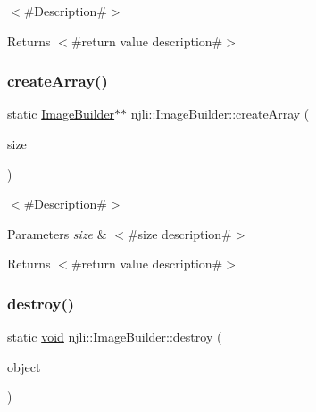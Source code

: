 $<$\#\+Description\#$>$

\begin{DoxyReturn}{Returns}
$<$\#return value description\#$>$ 
\end{DoxyReturn}
\mbox{\label{classnjli_1_1_image_builder_adfaa3f987876b3411e5ac6b2060d51c0}} 
\subsubsection{\texorpdfstring{create\+Array()}{createArray()}}
{\footnotesize\ttfamily static \mbox{\hyperlink{classnjli_1_1_image_builder}{Image\+Builder}}$\ast$$\ast$ njli\+::\+Image\+Builder\+::create\+Array (\begin{DoxyParamCaption}\item[{const \mbox{\hyperlink{_util_8h_a10e94b422ef0c20dcdec20d31a1f5049}{u32}}}]{size }\end{DoxyParamCaption})\hspace{0.3cm}{\ttfamily [static]}}

$<$\#\+Description\#$>$


\begin{DoxyParams}{Parameters}
{\em size} & $<$\#size description\#$>$\\
\hline
\end{DoxyParams}
\begin{DoxyReturn}{Returns}
$<$\#return value description\#$>$ 
\end{DoxyReturn}
\mbox{\label{classnjli_1_1_image_builder_a795fe08161c3424b63bee264dfd3726b}} 
\subsubsection{\texorpdfstring{destroy()}{destroy()}}
{\footnotesize\ttfamily static \mbox{\hyperlink{_thread_8h_af1e856da2e658414cb2456cb6f7ebc66}{void}} njli\+::\+Image\+Builder\+::destroy (\begin{DoxyParamCaption}\item[{\mbox{\hyperlink{classnjli_1_1_image_builder}{Image\+Builder}} $\ast$}]{object }\end{DoxyParamCaption})\hspace{0.3cm}{\ttfamily [static]}}

